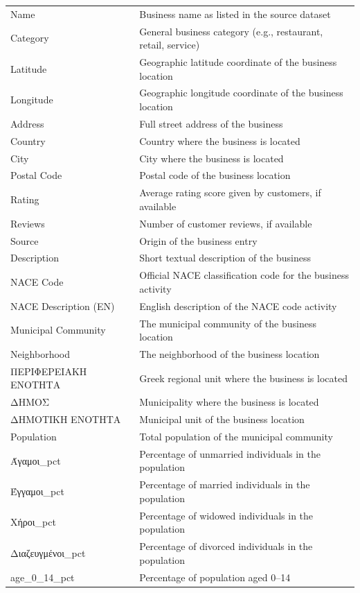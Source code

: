 \begin{longtable}{p{5cm} p{10cm}}
    Name & Business name as listed in the source dataset \\
    Category & General business category (e.g., restaurant, retail, service) \\
    Latitude & Geographic latitude coordinate of the business location \\
    Longitude & Geographic longitude coordinate of the business location \\
    Address & Full street address of the business \\
    Country & Country where the business is located \\
    City & City where the business is located \\
    Postal Code & Postal code of the business location \\
    Rating & Average rating score given by customers, if available \\
    Reviews & Number of customer reviews, if available \\
    Source & Origin of the business entry \\
    Description & Short textual description of the business \\
    NACE Code & Official NACE classification code for the business activity \\
    NACE Description (EN) & English description of the NACE code activity \\
    Municipal Community & The municipal community of the business location \\
    Neighborhood & The neighborhood of the business location \\
    ΠΕΡΙΦΕΡΕΙΑΚΗ ΕΝΟΤΗΤΑ & Greek regional unit where the business is located \\
    ΔΗΜΟΣ & Municipality where the business is located \\
    ΔΗΜΟΤΙΚΗ ΕΝΟΤΗΤΑ & Municipal unit of the business location \\
    Population & Total population of the municipal community \\
    Άγαμοι\_pct & Percentage of unmarried individuals in the population \\
    Έγγαμοι\_pct & Percentage of married individuals in the population \\
    Χήροι\_pct & Percentage of widowed individuals in the population \\
    Διαζευγμένοι\_pct & Percentage of divorced individuals in the population \\
    age\_0\_14\_pct & Percentage of population aged 0–14 \\

\end{longtable}
